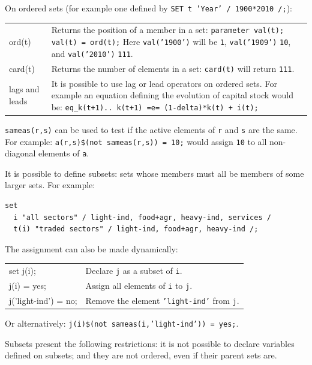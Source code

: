 \documentclass[10pt,landscape,a4paper]{article}
\begin{document}
\begin{multicols}{2}
On ordered sets (for example one defined by \texttt{SET t 'Year' / 1900*2010 /;}):
\begin{tabularx}{\columnwidth}{@{}>{\ttfamily}l>{\raggedright\arraybackslash}X@{}}
ord(t)& Returns the position of a member in a set:\linebreak{}
\texttt{parameter val(t);}\linebreak{}
\texttt{val(t) = ord(t);}\linebreak{}
Here \texttt{val('1900')} will be \texttt{1}, \texttt{val('1909')} \texttt{10}, and \texttt{val('2010')} \texttt{111}.\\
card(t) & Returns the number of elements in a set: \texttt{card(t)} will return \texttt{111}.\\
\textrm{lags and leads} & It is possible to use lag or lead operators on ordered
sets. For example an equation defining the evolution of capital stock would
be:\linebreak{}
\texttt{eq\_k(t+1).. k(t+1) =e= (1-delta)*k(t) + i(t);}
\end{tabularx}

\texttt{sameas(r,s)} can be used to test if the active elements of \texttt{r}
and \texttt{s} are the same. For example: \texttt{a(r,s)\$(not sameas(r,s)) =
  10;} would assign \texttt{10} to all non-diagonal elements of \texttt{a}.

It is possible to define subsets: sets whose members must all be members of some
larger sets. For example:\\
\begin{verbatim}
set
  i "all sectors" / light-ind, food+agr, heavy-ind, services /
  t(i) "traded sectors" / light-ind, food+agr, heavy-ind /;
\end{verbatim}
The assignment can also be made dynamically:
\begin{tabularx}{\columnwidth}{@{}>{\ttfamily}l>{\raggedright\arraybackslash}X@{}}
set j(i);& Declare \texttt{j} as a subset of \texttt{i}. \\
j(i) = yes;& Assign all elements of \texttt{i} to \texttt{j}.\\
j('light-ind') = no;& Remove the element \texttt{'light-ind'} from \texttt{j}.
\end{tabularx}
Or alternatively: \texttt{j(i)\$(not sameas(i,'light-ind')) = yes;}.  

Subsets present the following restrictions: it is not possible to declare
variables defined on subsets; and they are not ordered, even if their parent
sets are.


\end{multicols}
\end{document}
